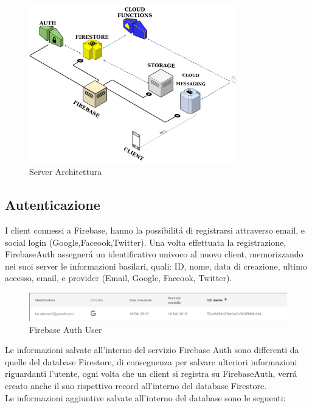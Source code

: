 \begin{figure}[!hb]
  \centering
  \includegraphics[width=0.8\textwidth]{immagini/server_arch.png}
  \caption{Server Architettura}\label{fig:Architettura Server}
\end{figure}

\subsection{Autenticazione}
I client connessi a Firebase, hanno la possibilit\'a di registrarsi attraverso email, e social login (Google,Faceook,Twitter). Una volta effettuata la registrazione, FirebaseAuth assegner\'a un identificativo univoco al nuovo client, memorizzando nei suoi server le informazioni basilari, quali: ID, nome, data di creazione, ultimo accesso, email, e provider (Email, Google, Faceook, Twitter).
\begin{figure}[!h]
  \centering
  \includegraphics[width=1\textwidth]{immagini/firebase_auth_user.png}
  \caption{Firebase Auth User}\label{fig:Firebase User}
\end{figure}

Le informazioni salvate all'interno del servizio Firebase Auth sono differenti da quelle del database Firestore, di conseguenza per salvare ulteriori informazioni riguardanti l'utente, ogni volta che un client si registra su FirebaseAuth, verr\'a creato anche il suo rispettivo record all'interno del database Firestore.\\
Le informazioni aggiuntive salvate all'interno del database sono le seguenti:

